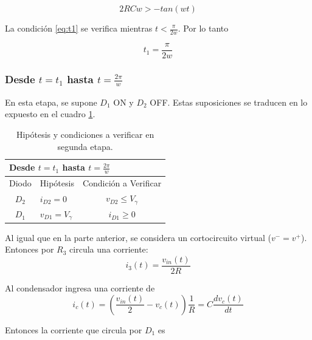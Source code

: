 \begin{equation*}
2RCw > -tan(wt)
\label{eq:t1}
\end{equation*}

La condición \ref{eq:t1} se verifica mientras $t < \frac{\pi}{2w}$.  Por lo tanto 

\begin{equation}
t_{1} = \frac{\pi}{2w}
\end{equation}

\subsubsection{Desde $t=t_1$ hasta $t=\frac{2\pi}{w}$}

En esta etapa, se supone $D_1$ ON y $D_2$ OFF. Estas suposiciones se traducen en lo expuesto en el cuadro \ref{cuadro:DSegEtapa}.


\begin{table}[!htb]
	\centering
	\caption{Hipótesis y condiciones a verificar en segunda etapa.}
	\label{cuadro:DSegEtapa}
	\begin{tabular}{lll}
		\multicolumn{3}{l}{Desde $t=t_1$ hasta $t=\frac{2\pi}{w}$}                                                                      \\ \hline
		\multicolumn{1}{|l|}{Diodo} & \multicolumn{1}{l|}{Hipótesis}          & \multicolumn{1}{c|}{Condición a Verificar}             \\ \hline
		\multicolumn{1}{|c|}{$D_2$} & \multicolumn{1}{l|}{$i_{D2}=0$}         & \multicolumn{1}{c|}{$v_{D2}\leq V_\gamma$} \\ \hline
		\multicolumn{1}{|c|}{$D_1$} & \multicolumn{1}{l|}{$v_{D1}= V_\gamma$} & \multicolumn{1}{c|}{$i_{D1}\geq 0$}        \\ \hline
	\end{tabular}
\end{table}

Al igual que en la parte anterior, se considera un cortocircuito virtual ($v^-=v^+$). Entonces por $R_3$ circula una corriente:
\begin{equation*}
	i_3(t) = \frac{v_{in}(t)}{2R}
\end{equation*}

Al condensador ingresa una corriente de
\begin{equation*}
		i_c(t) = \left( \frac{v_{in}(t)}{2}-v_{c}(t)\right) \frac{1}{R} = C \frac{dv_{c}(t)}{dt}
\end{equation*}

Entonces la corriente que circula por $D_1$ es 

